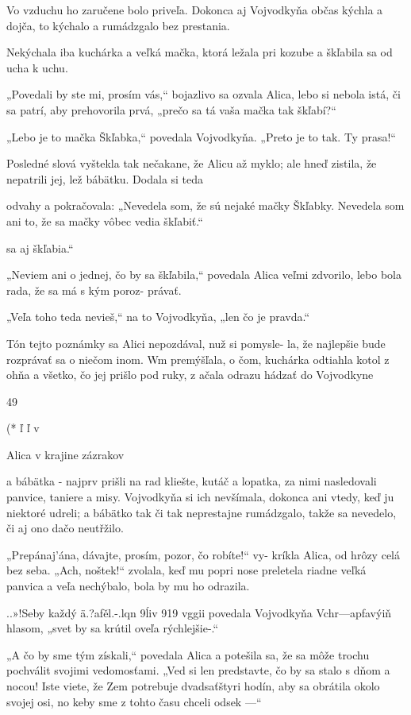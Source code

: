 \documentclass[12pt]{book}
\begin{document}
\begin{Parallel}[p]{}{}
{Vo vzduchu ho zaručene bolo priveľa. Dokonca aj
Vojvodkyňa občas kýchla a dojča, to kýchalo a rumádzgalo
bez prestania.

Nekýchala iba kuchárka a veľká mačka, ktorá ležala pri
kozube a škľabila sa od ucha k uchu.

„Povedali by ste mi, prosím vás,“ bojazlivo sa ozvala
Alica, lebo si nebola istá, či sa patrí, aby prehovorila prvá,
„prečo sa tá vaša mačka tak škľabí?“

„Lebo je to mačka Škľabka,“ povedala Vojvodkyňa.
„Preto je to tak. Ty prasa!“

Posledné slová vyštekla tak nečakane, že Alicu až myklo;
ale hneď zistila, že nepatrili jej, lež bábätku. Dodala si teda

odvahy a pokračovala:
„Nevedela som, že sú nejaké mačky Škľabky. Nevedela
som ani to, že sa mačky vôbec vedia škľabiť.“

sa aj škľabia.“

„Neviem ani o jednej, čo by sa škľabila,“ povedala Alica
veľmi zdvorilo, lebo bola rada, že sa má s kým poroz-
právať.

„Veľa toho teda nevieš,“ na to Vojvodkyňa, „len čo je
pravda.“

Tón tejto poznámky sa Alici nepozdával, nuž si pomysle-
la, že najlepšie bude rozprávať sa o niečom inom. Wm
premýšľala, o čom, kuchárka odtiahla kotol z ohňa a všetko,
čo jej prišlo pod ruky, z ačala odrazu hádzať do Vojvodkyne

49

  

(*
ľ
ľ
v

 

Alica v krajine zázrakov

a bábätka - najprv prišli na rad kliešte, kutáč a lopatka, za
nimi nasledovali panvice, taniere a misy. Vojvodkyňa si ich
nevšímala, dokonca ani vtedy, keď ju niektoré udreli;
a bábätko tak či tak neprestajne rumádzgalo, takže sa
nevedelo, či aj ono dačo neutřžilo.

„Prepánaj'ána, dávajte, prosím, pozor, čo robíte!“ vy-
kríkla Alica, od hrôzy celá bez seba. „Ach, noštek!“ zvolala,
keď mu popri nose preletela riadne veľká panvica a veľa
nechýbalo, bola by mu ho odrazila.

..»!Seby  každý ä.?afěl.-.lqn 9ĺiv 919   vggii povedala
Vojvodkyňa Vchr—apfavýiň hlasom, „svet by sa krútil oveľa
rýchlejšie-.“

„A čo by sme tým získali,“ povedala Alica a potešila sa,
že sa môže trochu pochválit svojimi vedomosťami. „Ved si
len predstavte, čo by sa stalo s dňom a nocou! Iste viete, že
Zem potrebuje dvadsaťštyri hodín, aby sa obrátila okolo
svojej osi, no keby sme z tohto času chceli odsek —“

}
\end{Parallel}
\end{document}
